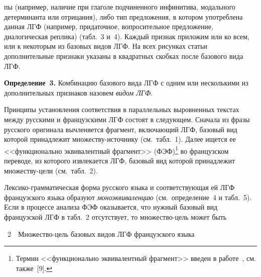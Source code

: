 \begin{multicols}{2}
\vspace*{12pt}



  \addtocounter{table}{1}

\noindent
пы (например, наличие при глаголе подчиненного
инфинитива, модального детерминанта или отрицания), либо тип предложения,
в котором упо\-треб\-ле\-на данная ЛГФ (например, придаточное, вопросительное
предложение, диалогическая реплика) (табл.~3 и~4).
Каждый признак приложим или ко всем, или к некоторым из базовых видов
ЛГФ. На всех рисунках статьи дополнительные признаки указаны в квадратных
скобках после базового вида ЛГФ.

  \smallskip

  \noindent
  \textbf{Определение~3.} Комбинацию базового вида ЛГФ с одним или
несколькими из дополнительных признаков назовем \textit{видом ЛГФ}.



  Принципы установления соответствия в параллельных выровненных текстах
между русскими и французскими ЛГФ состоят в следующем. Сначала из фразы
русского оригинала вычленяется фрагмент, включающий ЛГФ, базовый вид
которой принадлежит множеству-источнику (см.\ табл.~1). Далее
ищется ее <<функционально эквивалентный фрагмент>>
(ФЭФ)\footnote{Термин <<функционально эквивалентный фрагмент>> введен в
работе~\cite{zat-2}, см. также~[9].} во французском переводе, из которого
извлекается ЛГФ, базовый вид которой принадлежит мно\-же\-ст\-ву-цели (см.\
табл.~2).



  Лексико-грамматическая форма русского языка и соответствующая ей ЛГФ французского языка
образуют \textit{мо\-но\-эк\-ви\-ва\-лен\-цию} (см.\ определение~4 и
табл.~5). Если в процессе анализа ФЭФ оказывается, что нужный
базовый вид французской ЛГФ в табл.~2 отсутствует, то мно\-же\-ст\-во-цель
может быть\linebreak\vspace*{-12pt}

{\small %

\noindent
{{\tablename~2}\ \ \small{Множество-цель базовых видов ЛГФ французского языка}}
\vspace*{1pt}

}
\end{multicols}
